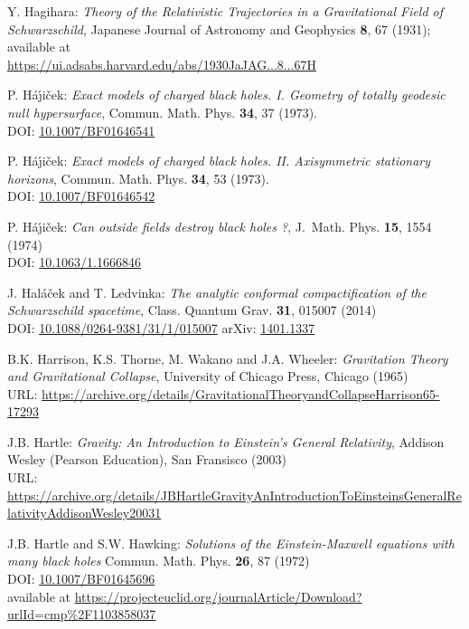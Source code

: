 \begin{thebibliography}{123}
Y. Hagihara:
\emph{Theory of the Relativistic Trajectories in a Gravitational Field of Schwarzschild},
Japanese Journal of Astronomy and Geophysics {\bf 8}, 67 (1931);
available at \\
\url{https://ui.adsabs.harvard.edu/abs/1930JaJAG...8...67H}

P. H\'a\'\j i\v{c}ek: {\em Exact models of charged black holes. I. Geometry
of totally geodesic null hypersurface},
Commun. Math. Phys. {\bf 34}, 37 (1973). \\
DOI: \href{https://doi.org/10.1007/BF01646541}{10.1007/BF01646541}

P. H\'a\'\j i\v{c}ek: {\em Exact models of charged black holes.
II. Axisymmetric stationary horizons},
Commun. Math. Phys. {\bf 34}, 53 (1973). \\
DOI: \href{https://doi.org/10.1007/BF01646542}{10.1007/BF01646542}

P. H\'a\'\j i\v{c}ek: {\em Can outside fields destroy black holes ?},
J.~Math. Phys. {\bf 15}, 1554 (1974)\\
DOI: \href{https://doi.org/10.1063/1.1666846}{10.1063/1.1666846}

J. Hal\'a\v{c}ek and T. Ledvinka:
{\em The analytic conformal compactification of the Schwarzschild spacetime},
Class. Quantum Grav. {\bf 31}, 015007 (2014)\\
DOI: \href{https://doi.org/10.1088/0264-9381/31/1/015007}{10.1088/0264-9381/31/1/015007}\hfill
arXiv: \href{https://arxiv.org/abs/1401.1337}{1401.1337}

B.K. Harrison, K.S. Thorne, M. Wakano and J.A. Wheeler:
{\em Gravitation Theory and Gravitational Collapse},
University of Chicago Press, Chicago (1965)\\
URL: {\footnotesize\url{https://archive.org/details/GravitationalTheoryandCollapseHarrison65-17293}}

J.B. Hartle: \emph{Gravity: An Introduction to Einstein's General Relativity},
Addison Wesley (Pearson Education), San Fransisco (2003)\\
URL: {\footnotesize\url{https://archive.org/details/JBHartleGravityAnIntroductionToEinsteinsGeneralRelativityAddisonWesley20031}}

J.B. Hartle and S.W. Hawking:
{\em Solutions of the Einstein-Maxwell equations with many black holes}
Commun. Math. Phys. {\bf 26}, 87 (1972)\\
DOI: \href{https://doi.org/10.1007/BF01645696}{10.1007/BF01645696}\\
available at {\footnotesize\url{https://projecteuclid.org/journalArticle/Download?urlId=cmp%2F1103858037}}


\end{thebibliography}
